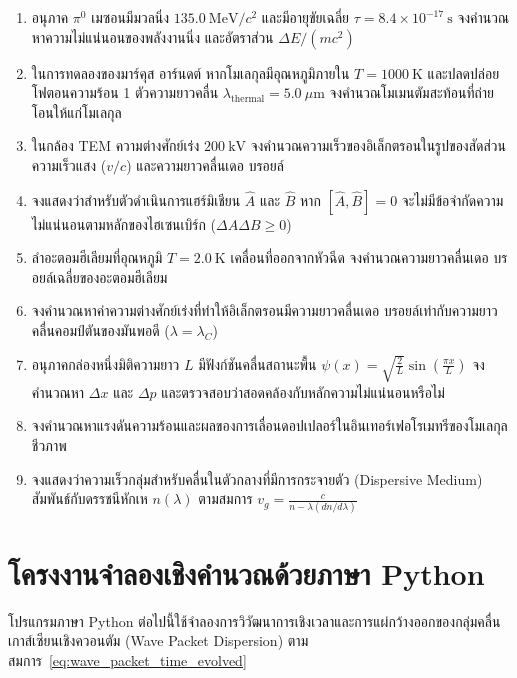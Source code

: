 \begin{enumerate}
    \item อนุภาค $\pi^0$ เมซอนมีมวลนิ่ง $135.0~\text{MeV}/c^2$ และมีอายุขัยเฉลี่ย $\tau = 8.4 \times 10^{-17}~\text{s}$ จงคำนวณหาความไม่แน่นอนของพลังงานนิ่ง และอัตราส่วน $\Delta E / (m c^2)$
    \item ในการทดลองของมาร์คุส อาร์นดต์ หากโมเลกุลมีอุณหภูมิภายใน $T = 1000~\text{K}$ และปลดปล่อยโฟตอนความร้อน 1 ตัวความยาวคลื่น $\lambda_{\text{thermal}} = 5.0~\mu\text{m}$ จงคำนวณโมเมนตัมสะท้อนที่ถ่ายโอนให้แก่โมเลกุล
    \item ในกล้อง TEM ความต่างศักย์เร่ง $200~\text{kV}$ จงคำนวณความเร็วของอิเล็กตรอนในรูปของสัดส่วนความเร็วแสง ($v/c$) และความยาวคลื่นเดอ บรอยล์
    \item จงแสดงว่าสำหรับตัวดำเนินการแฮร์มิเชียน $\hat{A}$ และ $\hat{B}$ หาก $[\hat{A}, \hat{B}] = 0$ จะไม่มีข้อจำกัดความไม่แน่นอนตามหลักของไฮเซนเบิร์ก ($\Delta A \Delta B \ge 0$)
    \item ลำอะตอมฮีเลียมที่อุณหภูมิ $T = 2.0~\text{K}$ เคลื่อนที่ออกจากหัวฉีด จงคำนวณความยาวคลื่นเดอ บรอยล์เฉลี่ยของอะตอมฮีเลียม
    \item จงคำนวณหาค่าความต่างศักย์เร่งที่ทำให้อิเล็กตรอนมีความยาวคลื่นเดอ บรอยล์เท่ากับความยาวคลื่นคอมป์ตันของมันพอดี ($\lambda = \lambda_C$)
    \item อนุภาคกล่องหนึ่งมิติความยาว $L$ มีฟังก์ชันคลื่นสถานะพื้น $\psi(x) = \sqrt{\frac{2}{L}}\sin\left(\frac{\pi x}{L}\right)$ จงคำนวณหา $\Delta x$ และ $\Delta p$ และตรวจสอบว่าสอดคล้องกับหลักความไม่แน่นอนหรือไม่
    \item จงคำนวณหาแรงดันความร้อนและผลของการเลื่อนดอปเปลอร์ในอินเทอร์เฟอโรเมทรีของโมเลกุลชีวภาพ
    \item จงแสดงว่าความเร็วกลุ่มสำหรับคลื่นในตัวกลางที่มีการกระจายตัว (Dispersive Medium) สัมพันธ์กับดรรชนีหักเห $n(\lambda)$ ตามสมการ $v_g = \frac{c}{n - \lambda (dn/d\lambda)}$
\end{enumerate}

\section{โครงงานจำลองเชิงคำนวณด้วยภาษา Python}

โปรแกรมภาษา Python ต่อไปนี้ใช้จำลองการวิวัฒนาการเชิงเวลาและการแผ่กว้างออกของกลุ่มคลื่นเกาส์เซียนเชิงควอนตัม (Wave Packet Dispersion) ตามสมการ~\eqref{eq:wave_packet_time_evolved}

